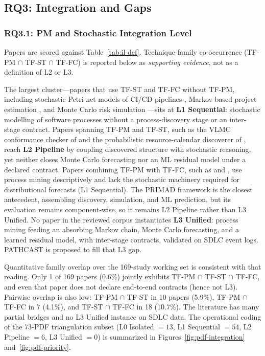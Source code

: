 \subsection{RQ3: Integration and Gaps}
\label{sec:slr-rq3}

\subsubsection{RQ3.1: PM and Stochastic Integration Level}

Papers are scored against Table~\ref{tab:il-def}. Technique-family
co-occurrence (TF-PM $\cap$ TF-ST $\cap$ TF-FC) is reported below as
\emph{supporting evidence}, not as a definition of L2 or L3.

The largest cluster---papers that use TF-ST and TF-FC without TF-PM,
including stochastic Petri net models of CI/CD pipelines
\cite{bhadra2022,bhadra2023}, Markov-based project estimation
\cite{massitela2018,tyagi2021}, and Monte Carlo risk simulation
\cite{lunesu2021,magennis2015}---sits at \textbf{L1 Sequential}:
stochastic modelling of software processes without a process-discovery
stage or an inter-stage contract. Papers spanning TF-PM and TF-ST, such as
the VLMC conformance checker of \cite{incerto2025} and the probabilistic
resource-calendar discoverer of \cite{lopezpintado2023}, reach
\textbf{L2 Pipeline} by coupling discovered structure with stochastic
reasoning, yet neither closes Monte Carlo forecasting nor an ML residual
model under a declared contract. Papers combining TF-PM with TF-FC, such as
\cite{gupta2017} and \cite{caldeira2022}, use process mining descriptively
and lack the stochastic machinery required for distributional forecasts
(L1 Sequential). The PRIMAD framework \cite{guinea2025} is the closest
antecedent, assembling discovery, simulation, and ML prediction, but its
evaluation remains component-wise, so it remains L2 Pipeline rather than
L3 Unified. No paper in the reviewed corpus instantiates \textbf{L3 Unified}:
process mining feeding an absorbing Markov chain, Monte Carlo forecasting,
and a learned residual model, with inter-stage contracts, validated on SDLC
event logs. PATHCAST is proposed to fill that L3 gap.

Quantitative family overlap over the 169-study working set is consistent
with that reading. Only 1 of 169 papers (0.6\%) jointly exhibits
TF-PM $\cap$ TF-ST $\cap$ TF-FC, and even that paper does not declare
end-to-end contracts (hence not L3). Pairwise overlap is also low:
TF-PM $\cap$ TF-ST in 10 papers (5.9\%), TF-PM $\cap$ TF-FC in 7 (4.1\%),
and TF-ST $\cap$ TF-FC in 18 (10.7\%). The literature has many partial
bridges and no L3 Unified instance on SDLC data. The operational coding of
the 73-PDF triangulation subset (L0 Isolated $=13$, L1 Sequential $=54$,
L2 Pipeline $=6$, L3 Unified $=0$) is summarized in
Figures~\ref{fig:pdf-integration} and~\ref{fig:pdf-priority}.

